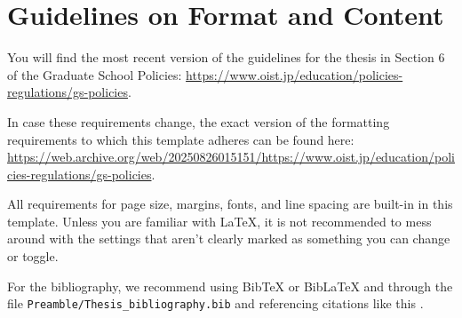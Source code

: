 
\chapter{Guidelines on Format and Content} \label{ch-1}

You will find the most recent version of the guidelines for the thesis in Section 6 of the Graduate School Policies: \url{https://www.oist.jp/education/policies-regulations/gs-policies}.

In case these requirements change, the exact version of the formatting requirements to which this template adheres can be found here: \url{https://web.archive.org/web/20250826015151/https://www.oist.jp/education/policies-regulations/gs-policies}.

All requirements for page size, margins, fonts, and line spacing are built-in
in this template. Unless you are familiar with LaTeX, it is not recommended
to mess around with the settings that aren't clearly marked as something you
can change or toggle.

For the bibliography, we recommend using BibTeX or BibLaTeX and through the file \texttt{Preamble/Thesis\_bibliography.bib} and referencing citations like this \cite{Lee98, Muc10, Kra27}. 
